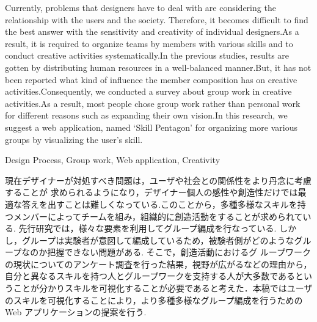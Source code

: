 \documentclass{funthesis}
\begin{document}
\maketitle       %

\begin{eabstract}
Currently, problems that designers have to deal with are considering the relationship with the users and the society. Therefore, it becomes difficult to find the best answer with the sensitivity and creativity of individual designers.As a result, it is required to organize teams by members with various skills and to conduct creative activities systematically.In the previous studies, results are gotten by distributing human resources in a well-balanced manner.But, it has not been reported what kind of influence the member composition has on creative activities.Consequently, we conducted a survey about group work in creative activities.As a result, most people chose group work rather than personal work for different reasons such as expanding their own vision.In this research, we suggest a web application, named ‘Skill Pentagon’ for organizing more various groups by visualizing the user's skill.
\end{eabstract}

\begin{ekeyword}
Design Process, Group work, Web application, Creativity
\end{ekeyword}

\begin{jabstract}
現在デザイナーが対処すべき問題は，ユーザや社会との関係性をより丹念に考慮することが 求められるようになり，デザイナー個人の感性や創造性だけでは最適な答えを出すことは難しくなっている.このことから，多種多様なスキルを持つメンバーによってチームを組み，組織的に創造活動をすることが求められている.  先行研究では，様々な要素を利用してグループ編成を行なっている.  しかし，グループは実験者が意図して編成しているため，被験者側がどのようなグループなのか把握できない問題がある.  そこで，創造活動におけるグ ループワークの現状についてのアンケート調査を行った結果，視野が広がるなどの理由から，自分と異なるスキルを持つ人とグループワークを支持する人が大多数であるということが分かりスキルを可視化することが必要であると考えた．本稿ではユーザのスキルを可視化することにより，より多種多様なグループ編成を行うための Web アプリケーションの提案を行う.
\end{jabstract}
\end{document}
